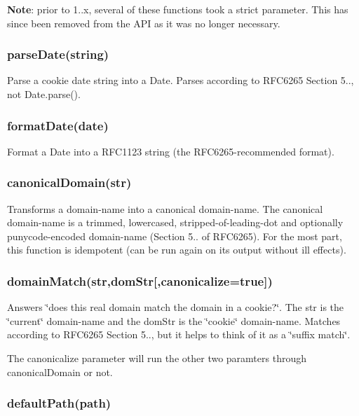 {\bfseries Note}\+: prior to 1..\+x, several of these functions took a {\ttfamily strict} parameter. This has since been removed from the A\+PI as it was no longer necessary.

\subsubsection*{{\ttfamily parse\+Date(string)}}

Parse a cookie date string into a {\ttfamily Date}. Parses according to R\+F\+C6265 Section 5.., not {\ttfamily Date.\+parse()}.

\subsubsection*{{\ttfamily format\+Date(date)}}

Format a Date into a R\+F\+C1123 string (the R\+F\+C6265-\/recommended format).

\subsubsection*{{\ttfamily canonical\+Domain(str)}}

Transforms a domain-\/name into a canonical domain-\/name. The canonical domain-\/name is a trimmed, lowercased, stripped-\/of-\/leading-\/dot and optionally punycode-\/encoded domain-\/name (Section 5.. of R\+F\+C6265). For the most part, this function is idempotent (can be run again on its output without ill effects).

\subsubsection*{{\ttfamily domain\+Match(str,dom\+Str\mbox{[},canonicalize=true\mbox{]})}}

Answers \char`\"{}does this real domain match the domain in a cookie?\char`\"{}. The {\ttfamily str} is the \char`\"{}current\char`\"{} domain-\/name and the {\ttfamily dom\+Str} is the \char`\"{}cookie\char`\"{} domain-\/name. Matches according to R\+F\+C6265 Section 5.., but it helps to think of it as a \char`\"{}suffix match\char`\"{}.

The {\ttfamily canonicalize} parameter will run the other two paramters through {\ttfamily canonical\+Domain} or not.

\subsubsection*{{\ttfamily default\+Path(path)}}

